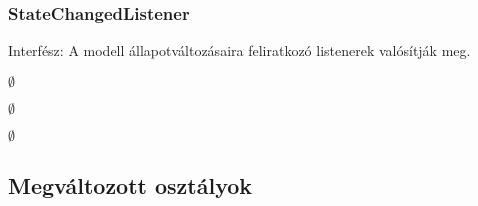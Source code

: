 \documentclass[../../projlab]{subfiles}
\begin{document}
\subsubsection{StateChangedListener}
\begin{class-template-responsibility}
    Interfész: A modell állapotváltozásaira feliratkozó listenerek valósítják meg. 
\end{class-template-responsibility}
\begin{class-template-interface}
    $\emptyset$
\end{class-template-interface}
\begin{class-template-baseclass}
    $\emptyset$
\end{class-template-baseclass}
\begin{class-template-attribute}
    \item[] $\emptyset$
\end{class-template-attribute}
\begin{class-template-method}
\end{class-template-method}

\subsection{Megváltozott osztályok}
\end{document}
